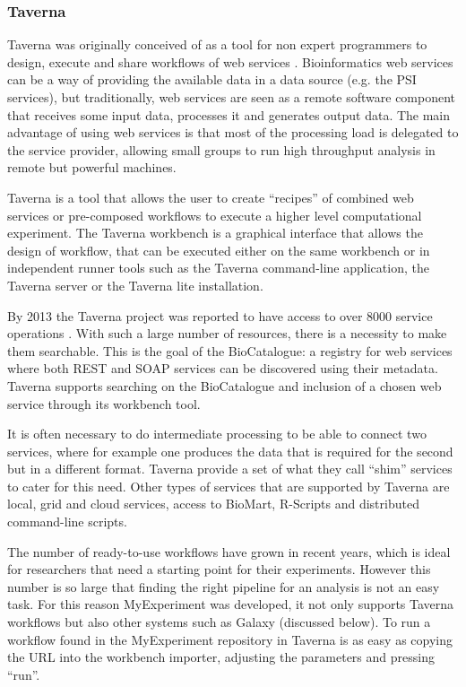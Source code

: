 \subsubsection{Taverna}
Taverna was originally conceived of as a tool for non expert programmers to design, execute and share workflows of web services \cite{HUL2006}. Bioinformatics web services can be a way of providing the available data in a data source (e.g. the PSI services), but traditionally, web services are seen as a remote software component that receives some input data, processes it and generates output data. The main advantage of using web services  is that most of the processing load is delegated to the service provider, allowing small groups to run high throughput analysis in remote but powerful machines.

Taverna is a tool that allows the user to create ``recipes'' of combined web services or pre-composed workflows to execute a higher level computational experiment. The Taverna workbench is a graphical interface that allows the design of workflow, that can be executed either on the same workbench or in independent runner tools such as the Taverna command-line application, the Taverna server or the Taverna lite installation.

By 2013 the Taverna project was reported to have access to over 8000 service operations \cite{WOL2013}. With such a large number of resources, there is a necessity to make them searchable. This is the goal of the BioCatalogue: a registry for web services where both REST and SOAP services can be discovered using their metadata. Taverna supports searching on the BioCatalogue and inclusion of a chosen web service through its workbench tool.

It is often necessary to do intermediate processing to be able to connect two services, where for example one produces the data that is required for the second but in a different format. Taverna provide a set of what they call ``shim'' services to cater for this need. Other types of services that are supported by Taverna are local, grid and cloud services, access to BioMart, R-Scripts and distributed command-line scripts.

The number of ready-to-use workflows have grown in recent years, which is ideal for researchers that need a starting point for their experiments. However this number is so large that finding the right pipeline for an analysis is not an easy task. For this reason MyExperiment was developed, it not only supports Taverna workflows but also other systems such as Galaxy (discussed below). To run a workflow found in the MyExperiment repository in Taverna is as easy as copying the URL into the workbench importer, adjusting the parameters and pressing ``run''.

